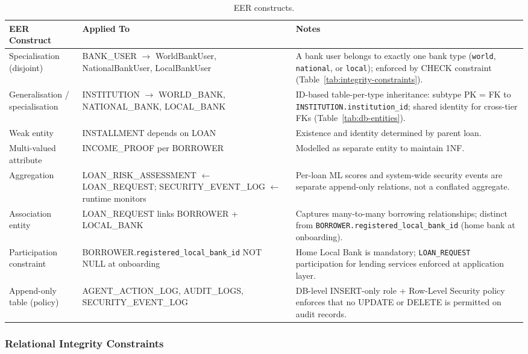\documentclass[12pt,a4paper]{report}
\newcommand{\tableheadcolor}{\rowcolor{TableHeadBg}}
\begin{document}
\begin{table}[H]
\centering
\caption[EER constructs]{EER constructs.}
\label{tab:eer-constructs}
\begin{tabular}{p{3.5cm}p{3.5cm}p{6.5cm}}
\toprule
\tableheadcolor
\textbf{EER Construct} & \textbf{Applied To} & \textbf{Notes} \\
\midrule
Specialisation (disjoint) & BANK\_USER $\to$ WorldBankUser, NationalBankUser, LocalBankUser & A bank user belongs to exactly one bank type (\texttt{world}, \texttt{national}, or \texttt{local}); enforced by CHECK constraint (Table~\ref{tab:integrity-constraints}). \\
Generalisation / specialisation & INSTITUTION $\to$ WORLD\_BANK, NATIONAL\_BANK, LOCAL\_BANK & ID-based table-per-type inheritance: subtype PK = FK to \texttt{INSTITUTION.institution\_id}; shared identity for cross-tier FKs (Table~\ref{tab:db-entities}). \\
Weak entity & INSTALLMENT depends on LOAN & Existence and identity determined by parent loan. \\
Multi-valued attribute & INCOME\_PROOF per BORROWER & Modelled as separate entity to maintain 1NF. \\
Aggregation & LOAN\_RISK\_ASSESSMENT $\leftarrow$ LOAN\_REQUEST; SECURITY\_EVENT\_LOG $\leftarrow$ runtime monitors & Per-loan ML scores and system-wide security events are separate append-only relations, not a conflated aggregate. \\
Association entity & LOAN\_REQUEST links BORROWER + LOCAL\_BANK & Captures many-to-many borrowing relationships; distinct from \texttt{BORROWER.registered\_local\_bank\_id} (home bank at onboarding). \\
Participation constraint & BORROWER.\texttt{registered\_local\_bank\_id} NOT NULL at onboarding & Home Local Bank is mandatory; \texttt{LOAN\_REQUEST} participation for lending services enforced at application layer. \\
Append-only table (policy) & AGENT\_ACTION\_LOG, AUDIT\_LOGS, SECURITY\_EVENT\_LOG & DB-level INSERT-only role + Row-Level Security policy enforces that no UPDATE or DELETE is permitted on audit records. \\
\bottomrule
\end{tabular}
\end{table}

\subsubsection{Relational Integrity Constraints}
\label{sec:integrity-constraints}
\end{document}
